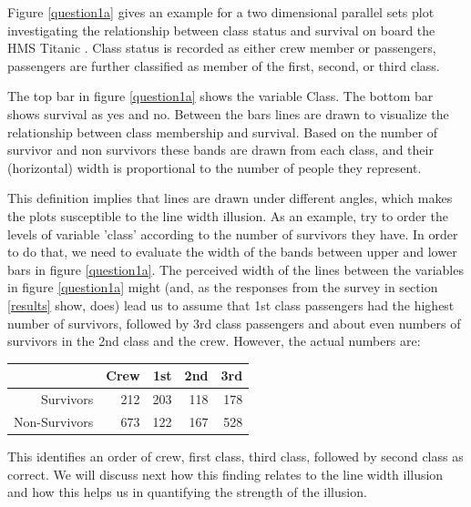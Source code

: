 Figure \ref{question1a} gives an example for a two dimensional parallel sets plot investigating the relationship between class status and survival on board the HMS Titanic  \citep{dawson:1995}. Class status is recorded as either crew member or passengers, passengers are further classified as member of the first, second, or third class. 

 The top bar in figure \ref{question1a} shows the  variable Class. The bottom bar shows survival  as yes and no. Between the bars lines are drawn to visualize the relationship between class membership and  survival. 
  Based on the number of survivor and non survivors
  these bands are drawn from each class, and their (horizontal) width is proportional to the number of people they represent. 

This definition implies that lines are drawn under different angles, which makes the plots susceptible to the line width illusion. As an example, try to order the levels of variable 'class'  according to the number of survivors they have. In order to do that, we need to evaluate the width of the bands between upper and lower bars in figure \ref{question1a}.
The  perceived width of the lines between the variables in figure \ref{question1a} might  (and, as the responses from the survey in section \ref{results} show, does) lead us to assume that 1st class passengers had the highest number of survivors, followed by 3rd class passengers and about even numbers of survivors in the 2nd class  and  the crew. However, the  actual numbers are:
%
\begin{center}
\begin{tabular}{rrrrr}
& Crew & 1st & 2nd & 3rd \\ \hline
Survivors & 212 & 203 & 118 & 178\\
Non-Survivors & 673 & 122 & 167 &  528  
\end{tabular}
\end{center}
This identifies an order of crew, first class, third class, followed by second class as correct. 
We will discuss next how this finding relates to the line width illusion and how this helps us in quantifying the strength of the illusion.




